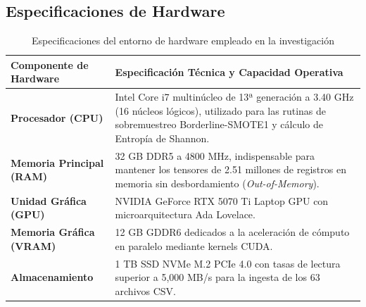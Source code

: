 \subsection{Especificaciones de Hardware}
\begin{table}[H]
\centering
\caption{Especificaciones del entorno de hardware empleado en la investigación}
\label{tab:hardware_2_mm}
\small



\begin{tabularx}{\textwidth}{p{4.0cm} X}
\toprule
\textbf{Componente de Hardware} & \textbf{Especificación Técnica y Capacidad Operativa} \\
\midrule
\textbf{Procesador (CPU)} & Intel Core i7 multinúcleo de 13ª generación a 3.40 GHz (16 núcleos lógicos), utilizado para las rutinas de sobremuestreo Borderline-SMOTE1 y cálculo de Entropía de Shannon. \\
\textbf{Memoria Principal (RAM)} & 32 GB DDR5 a 4800 MHz, indispensable para mantener los tensores de 2.51 millones de registros en memoria sin desbordamiento (\textit{Out-of-Memory}). \\
\textbf{Unidad Gráfica (GPU)} & NVIDIA GeForce RTX 5070 Ti Laptop GPU con microarquitectura Ada Lovelace. \\
\textbf{Memoria Gráfica (VRAM)} & 12 GB GDDR6 dedicados a la aceleración de cómputo en paralelo mediante kernels CUDA. \\
\textbf{Almacenamiento} & 1 TB SSD NVMe M.2 PCIe 4.0 con tasas de lectura superior a 5,000 MB/s para la ingesta de los 63 archivos CSV. \\
\bottomrule
\end{tabularx}
\end{table}

